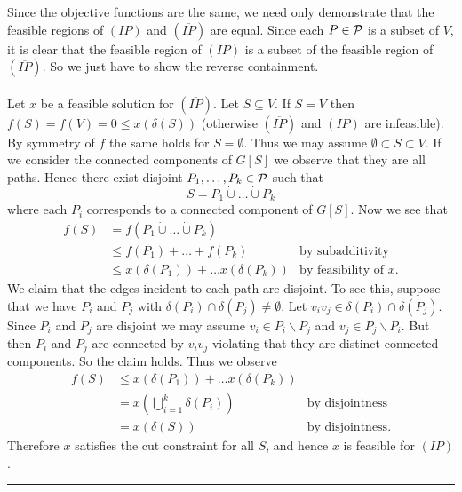 \documentclass[letterpaper,12pt,oneside,onecolumn]{article}
\newenvironment{proof}{{\bf Proof:  }}{\hfill\rule{2mm}{2mm}}
\begin{document}
\begin{proof}
Since the objective functions are the same, we need only demonstrate that the feasible regions of $(IP)$ and $(\overline{IP})$ are equal. Since each $P \in \mathcal{P}$ is a subset of $V$, it is clear that the feasible region of $(IP)$ is a subset of the feasible region of $(\overline{IP})$. So we just have to show the reverse containment.
\paragraph{}
Let $x$ be a feasible solution for $(\overline{IP})$. Let $S \subseteq V$. If $S = V$ then $f(S)= f(V)=0\leq x(\delta(S)) $ (otherwise $(\overline{IP})$ and $(IP)$ are infeasible). By symmetry of $f$ the same holds for $S =\emptyset$. Thus we may assume $\emptyset \subset S \subset V$. If we consider the connected components of $G[S]$ we observe that they are all paths. Hence there exist disjoint $P_1, \dots, P_k \in \mathcal{P}$ such that
$$S = P_1 \dot\cup \dots \dot\cup P_k$$
where each $P_i$ corresponds to a connected component of $G[S]$. Now we see that
\begin{align*}
f(S) &= f(P_1 \dot\cup \dots \dot \cup P_k) \\
&\leq f(P_1) + \dots + f(P_k) &\text{by subadditivity} \\
&\leq x(\delta(P_1)) + \dots x(\delta(P_k)) &\text{by feasibility of $x$}.
\end{align*}
We claim that the edges incident to each path are disjoint. To see this, suppose that we have $P_i$ and $P_j$ with $\delta(P_i) \cap \delta(P_j) \neq \emptyset$. Let $v_iv_j \in \delta(P_i) \cap \delta(P_j)$. Since $P_i$ and $P_j$ are disjoint we may assume $v_i \in P_i \backslash P_j$ and $v_j \in P_j \backslash P_i$. But then $P_i$ and $P_j$ are connected by $v_iv_j$ violating that they are distinct connected components. So the claim holds. Thus we observe
\begin{align*}
f(S) &\leq x(\delta(P_1)) + \dots x(\delta(P_k)) \\
&= x(\bigcup_{i=1}^k \delta(P_i)) &\text{by disjointness}\\
&= x(\delta(S)) &\text{by disjointness}.
\end{align*}
Therefore $x$ satisfies the cut constraint for all $S$, and hence $x$ is feasible for $(IP)$.
\end{proof}
\end{document}
